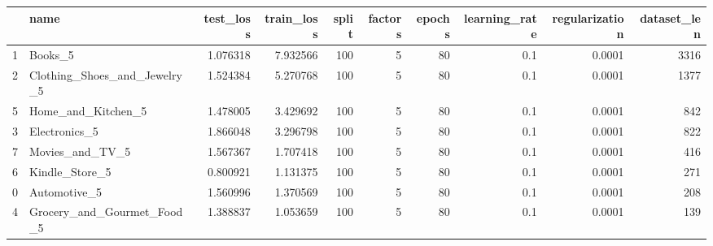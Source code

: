 \begin{tabular}{llrrrrrrrr}
\toprule
{} &                          name &  test\_loss &  train\_loss &  split &  factors &  epochs &  learning\_rate &  regularization &  dataset\_len \\
\midrule
1 &                       Books\_5 &   1.076318 &    7.932566 &    100 &        5 &      80 &            0.1 &          0.0001 &         3316 \\
2 &  Clothing\_Shoes\_and\_Jewelry\_5 &   1.524384 &    5.270768 &    100 &        5 &      80 &            0.1 &          0.0001 &         1377 \\
5 &            Home\_and\_Kitchen\_5 &   1.478005 &    3.429692 &    100 &        5 &      80 &            0.1 &          0.0001 &          842 \\
3 &                 Electronics\_5 &   1.866048 &    3.296798 &    100 &        5 &      80 &            0.1 &          0.0001 &          822 \\
7 &               Movies\_and\_TV\_5 &   1.567367 &    1.707418 &    100 &        5 &      80 &            0.1 &          0.0001 &          416 \\
6 &                Kindle\_Store\_5 &   0.800921 &    1.131375 &    100 &        5 &      80 &            0.1 &          0.0001 &          271 \\
0 &                  Automotive\_5 &   1.560996 &    1.370569 &    100 &        5 &      80 &            0.1 &          0.0001 &          208 \\
4 &    Grocery\_and\_Gourmet\_Food\_5 &   1.388837 &    1.053659 &    100 &        5 &      80 &            0.1 &          0.0001 &          139 \\
\bottomrule
\end{tabular}
